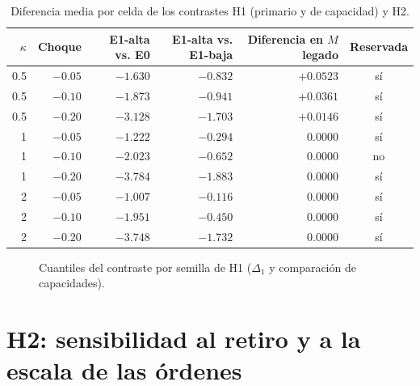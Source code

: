 \begin{table}[htbp]
\centering
\caption{Diferencia media por celda de los contrastes H1 (primario y de capacidad) y H2.}
\label{tab:celdas}
\small
\begin{tabular}{@{}rrrrrc@{}}
\toprule
$\kappa$ & Choque & E1-alta vs. E0 & E1-alta vs. E1-baja & Diferencia en $M$ legado & Reservada \\
\midrule
0.5 & $-0.05$ & $-1.630$ & $-0.832$ & $+0.0523$ & sí \\
0.5 & $-0.10$ & $-1.873$ & $-0.941$ & $+0.0361$ & sí \\
0.5 & $-0.20$ & $-3.128$ & $-1.703$ & $+0.0146$ & sí \\
1 & $-0.05$ & $-1.222$ & $-0.294$ & $0.0000$ & sí \\
1 & $-0.10$ & $-2.023$ & $-0.652$ & $0.0000$ & no \\
1 & $-0.20$ & $-3.784$ & $-1.883$ & $0.0000$ & sí \\
2 & $-0.05$ & $-1.007$ & $-0.116$ & $0.0000$ & sí \\
2 & $-0.10$ & $-1.951$ & $-0.450$ & $0.0000$ & sí \\
2 & $-0.20$ & $-3.748$ & $-1.732$ & $0.0000$ & sí \\
\bottomrule
\end{tabular}
\end{table}

\begin{figure}[htbp]
\centering
{}
\caption{Cuantiles del contraste por semilla de H1 ($\Delta_1$ y comparación de capacidades).}
\label{fig:cuantiles}
\end{figure}

\section{H2: sensibilidad al retiro y a la escala de las órdenes}
\label{sec:res-h2}

